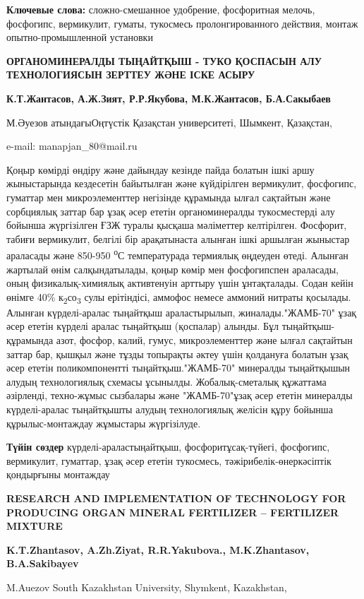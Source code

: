 \textbf{Ключевые слова:} сложно-смешанное удобрение, фосфоритная мелочь,
фосфогипс, вермикулит, гуматы, тукосмесь пролонгированного действия,
монтаж опытно-промышленной установки

\textbf{ОРГАНОМИНЕРАЛДЫ ТЫҢАЙТҚЫШ - ТУКО ҚОСПАСЫН АЛУ ТЕХНОЛОГИЯСЫН
ЗЕРТТЕУ ЖӘНЕ ІСКЕ АСЫРУ}

\textbf{К.Т.Жантасов, А.Ж.Зият, Р.Р.Якубова, М.К.Жантасов, Б.А.Сакыбаев}

М.Әуезов атындағыОңтүстік Қазақстан университеті, Шымкент, Қазақстан,

e-mail: manapjan\_80@mail.ru

Қоңыр көмірді өндіру және дайындау кезінде пайда болатын ішкі аршу
жыныстарында кездесетін байытылған және күйдірілген вермикулит,
фосфогипс, гуматтар мен микроэлементтер негізінде құрамында ылғал
сақтайтын және сорбциялық заттар бар ұзақ әсер ететін органоминералды
тукосместерді алу бойынша жүргізілген ҒЗЖ туралы қысқаша мәліметтер
келтірілген. Фосфорит, табиғи вермикулит, белгілі бір арақатынаста
алынған ішкі аршылған жыныстар араласады және 850-950
\textsuperscript{о}С температурада термиялық өңдеуден өтеді. Алынған
жартылай өнім салқындатылады, қоңыр көмір мен фосфогипспен араласады,
оның физикалық-химиялық активтенуін арттыру үшін ұнтақталады. Содан
кейін өнімге 40\% к\textsubscript{2}со\textsubscript{3} сулы ерітіндісі,
аммофос немесе аммоний нитраты қосылады. Алынған күрделі-аралас
тыңайтқыш араластырылып, жиналады."ЖАМБ-70" ұзақ әсер ететін күрделі
аралас тыңайтқыш (қоспалар) алынды. Бұл тыңайтқыш-құрамында азот,
фосфор, калий, гумус, микроэлементтер және ылғал сақтайтын заттар бар,
қышқыл және тұзды топырақты әктеу үшін қолдануға болатын ұзақ әсер
ететін поликомпонентті тыңайтқыш."ЖАМБ-70" минералды тыңайтқышын алудың
технологиялық схемасы ұсынылды. Жобалық-сметалық құжаттама әзірленді,
техно-жұмыс сызбалары және "ЖАМБ-70"ұзақ әсер ететін минералды
күрделі-аралас тыңайтқышты алудың технологиялық желісін құру бойынша
құрылыс-монтаждау жұмыстары жүргізілуде.

\textbf{Түйін сөздер} күрделі-араластыңайтқыш, фосфоритұсақ-түйегі,
фосфогипс, вермикулит, гуматтар, ұзақ әсер ететін тукосмесь,
тәжірибелік-өнеркәсіптік қондырғыны монтаждау

\textbf{RESEARCH AND IMPLEMENTATION OF TECHNOLOGY FOR PRODUCING ORGAN
MINERAL FERTILIZER -- FERTILIZER MIXTURE}

\textbf{K.T.Zhantasov, A.Zh.Ziyat, R.R.Yakubova., M.K.Zhantasov,
B.A.Sakibayev}

M.Auezov South Kazakhstan University, Shymkent, Kazakhstan,

